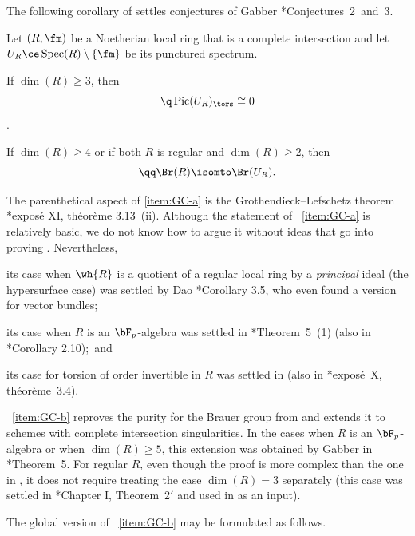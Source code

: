 The following corollary of  settles conjectures of Gabber \cite{Gab04}*{Conjectures~2~and~3}.

 \label{thm:Gabber-conjectures}
Let $(R, \fm)$ be a Noetherian local ring  that is a complete intersection and let $U_R \ce \Spec(R) \setminus \{ \fm\}$ be its punctured spectrum.
\benum
\item {}
If $\dim(R) \ge 3$, then
\[
\q\Pic(U_R)_\tors \cong 0
\]
.

\item {}
If $\dim(R) \ge 4$ or if both $R$ is regular and $\dim(R) \ge 2$, then
\[
\qq\Br(R) \isomto \Br(U_R).
\]
\eenum
\ethm

The parenthetical aspect of \ref{item:GC-a} is the Grothendieck--Lefschetz theorem \cite{SGA2new}*{expos\'{e} XI, th\'{e}or\`{e}me 3.13~(ii)}. Although the statement of ~\ref{item:GC-a} is relatively basic, we do not know how to argue it without ideas that go into proving . Nevertheless,
\begin{itemize}
\m
its case when $\wh{R}$ is a quotient of a regular local ring by a \emph{principal} ideal (the hypersurface case) was settled by Dao \cite{Dao12}*{Corollary 3.5}, who even found a version for vector bundles;

\m
its case when $R$ is an $\bF_p$-algebra was settled in \cite{Gab04}*{Theorem~5~(1)} (also in \cite{DLM10}*{Corollary 2.10});~and

\m
its case for torsion of order invertible in $R$ was settled in \cite{Rob76} (also in %
\cite{SGA2new}*{expos\'{e}~X, th\'{e}or\`{e}me~3.4}).
\end{itemize}


~\ref{item:GC-b} reproves the purity for the Brauer group from \cite{brauer-purity} and extends it to schemes with complete intersection singularities. In the cases when $R$ is an $\bF_p$-algebra or when $\dim(R) \ge 5$, this extension was obtained by Gabber in \cite{Gab04}*{Theorem~5}. For regular $R$, even though  the proof is more complex than the one in \cite{brauer-purity}, it does not require treating the case $\dim(R) = 3$ separately (this case was settled in \cite{Gab81}*{Chapter I, Theorem~2$'$} and used in \cite{brauer-purity} as an input).

The global version of ~\ref{item:GC-b} may be formulated as follows.

